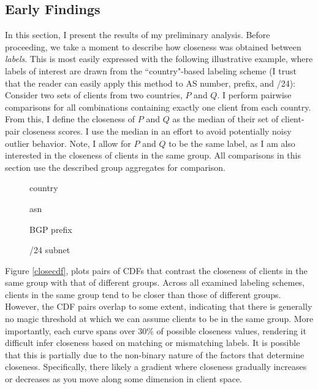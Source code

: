 \subsection{Early Findings} \label{skyfinds}

In this section, I present the results of my preliminary analysis. Before proceeding, we take a
moment to describe how closeness was obtained between \emph{labels}. This is most easily expressed
with the following illustrative example, where labels of interest are drawn from the
``country"-based labeling scheme (I trust that the reader can easily apply this method to AS
number, prefix, and /24): Consider two sets of clients from two countries, $P$ and $Q$. I perform
pairwise comparisons for all combinations containing exactly one client from each country.  From
this, I define the closeness of $P$ and $Q$ as the median of their set of client-pair closeness
scores. I use the median in an effort to avoid potentially noisy outlier behavior. Note, I allow
for $P$ and $Q$ to be the same label, as I am also interested in the closeness of clients in the
same group. All comparisons in this section use the described group aggregates for comparison. 

\begin{figure*}
    \center
            \begin{subfigure}[b]{.7\linewidth}
                \caption{country}
            \end{subfigure}
            \begin{subfigure}[b]{.7\linewidth}
                \caption{asn}
            \end{subfigure}
            \begin{subfigure}[b]{.7\linewidth}
                \caption{BGP prefix}
            \end{subfigure}
            \begin{subfigure}[b]{.7\linewidth}
                \caption{/24 subnet}
            \end{subfigure}
            \caption{CDFs of aggregate group closeness.}
            \label{closecdf}
\end{figure*}

Figure \ref{closecdf}, plots pairs of CDFs that contrast the closeness of clients in the same group with
that of different groups. Across all examined labeling schemes, clients in the same group tend to be
closer than those of different groups. However, the CDF pairs overlap to some extent, indicating
that there is generally no magic threshold at which we can assume clients to be in the same group.
More importantly, each curve spans over 30\% of possible closeness values, rendering it difficult
infer closeness based on matching or mismatching labels. It is possible that this is partially due
to the non-binary nature of the factors that determine closeness. Specifically, there likely a
gradient where closeness gradually increases or decreases as you move along some dimension in
client space. 

